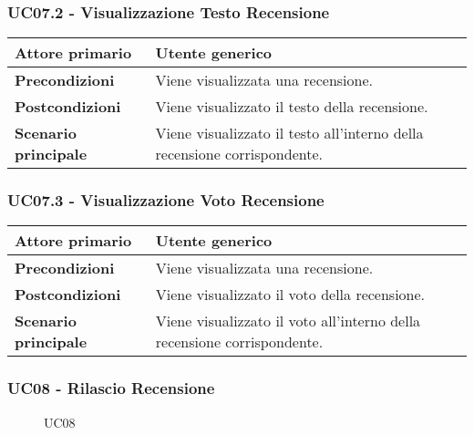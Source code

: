 \subsubsection{UC07.2 - Visualizzazione Testo Recensione}
\label{UC07.2}
\begin{center}
\renewcommand{\arraystretch}{1.5}
\begin{tabular}{ | m{10em} | m{20em} | }
    \hline
    \textbf{Attore primario} & Utente generico \\
    \hline
    \textbf{Precondizioni} & Viene visualizzata una recensione. \\
    \hline
    \textbf{Postcondizioni} & Viene visualizzato il testo della recensione. \\
    \hline
    \textbf{Scenario principale} & Viene visualizzato il testo all'interno della recensione corrispondente. \\
    \hline
   \end{tabular}
\end{center}

\subsubsection{UC07.3 - Visualizzazione Voto Recensione}
\label{UC07.3}
\begin{center}
    \renewcommand{\arraystretch}{1.5}
    \begin{tabular}{ | m{10em} | m{20em} | }
        \hline
        \textbf{Attore primario} & Utente generico \\
        \hline
        \textbf{Precondizioni} & Viene visualizzata una recensione. \\
        \hline
        \textbf{Postcondizioni} & Viene visualizzato il voto della recensione. \\
        \hline
        \textbf{Scenario principale} & Viene visualizzato il voto all'interno della recensione corrispondente. \\
        \hline
       \end{tabular}
    \end{center}

\subsubsection{UC08 - Rilascio Recensione}
\label{UC08}

\begin{figure}[H]
    \centering
    
    \caption{UC08}
 \end{figure}

